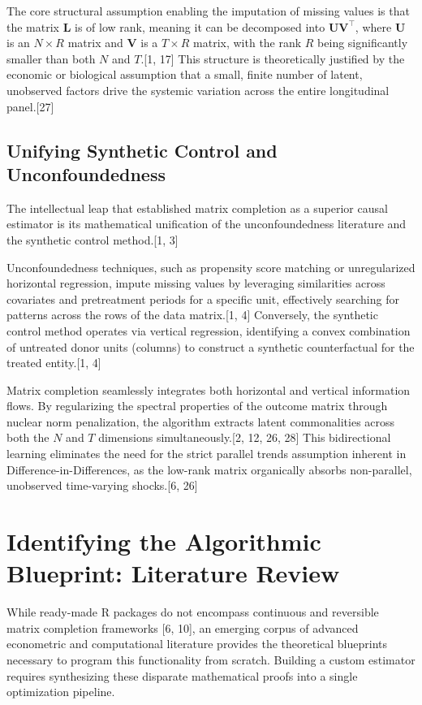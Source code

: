 \documentclass{article}
\begin{document}
The core structural assumption enabling the imputation of missing values is that the matrix $\mathbf{L}$ is of low rank, meaning it can be decomposed into $\mathbf{U}\mathbf{V}^\top$, where $\mathbf{U}$ is an $N \times R$ matrix and $\mathbf{V}$ is a $T \times R$ matrix, with the rank $R$ being significantly smaller than both $N$ and $T$.[1, 17] This structure is theoretically justified by the economic or biological assumption that a small, finite number of latent, unobserved factors drive the systemic variation across the entire longitudinal panel.[27]

\subsection{Unifying Synthetic Control and Unconfoundedness}

The intellectual leap that established matrix completion as a superior causal estimator is its mathematical unification of the unconfoundedness literature and the synthetic control method.[1, 3] 

Unconfoundedness techniques, such as propensity score matching or unregularized horizontal regression, impute missing values by leveraging similarities across covariates and pretreatment periods for a specific unit, effectively searching for patterns across the rows of the data matrix.[1, 4] Conversely, the synthetic control method operates via vertical regression, identifying a convex combination of untreated donor units (columns) to construct a synthetic counterfactual for the treated entity.[1, 4] 

Matrix completion seamlessly integrates both horizontal and vertical information flows. By regularizing the spectral properties of the outcome matrix through nuclear norm penalization, the algorithm extracts latent commonalities across both the $N$ and $T$ dimensions simultaneously.[2, 12, 26, 28] This bidirectional learning eliminates the need for the strict parallel trends assumption inherent in Difference-in-Differences, as the low-rank matrix organically absorbs non-parallel, unobserved time-varying shocks.[6, 26]

\section{Identifying the Algorithmic Blueprint: Literature Review}

While ready-made R packages do not encompass continuous and reversible matrix completion frameworks [6, 10], an emerging corpus of advanced econometric and computational literature provides the theoretical blueprints necessary to program this functionality from scratch. Building a custom estimator requires synthesizing these disparate mathematical proofs into a single optimization pipeline.
\end{document}
